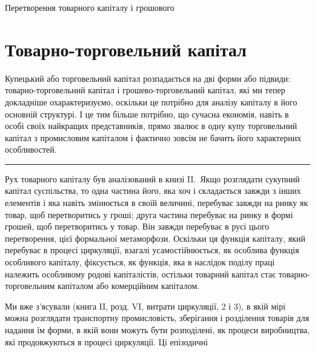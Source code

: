 

%
  {\protect\partnumberline{\thepart}Перетворення товарного капіталу і грошового}%

%
%
  {\protect{}}%

%
%
  {\protect{}}%

\section{Товарно-торговельний капітал}

Купецький або торговельний капітал розпадається на дві
форми або підвиди: товарно-торговельний капітал і грошево-торговельний
капітал, які ми тепер докладніше охарактеризуємо,
оскільки це потрібно для аналізу капіталу в його основній структурі.
І це тим більше потрібно, що сучасна економія, навіть
в особі своїх найкращих представників, прямо звалює в одну
купу торговельний капітал з промисловим капіталом і фактично
зовсім не бачить його характерних особливостей.

\pfbreak{}

Рух товарного капіталу був аналізований в книзі II.~Якщо
розглядати сукупний капітал суспільства, то одна частина
його, яка хоч і складається завжди з інших елементів і яка навіть
змінюється в своїй величині, перебуває завжди на ринку
як товар, щоб перетворитись у гроші; друга частина перебуває
на ринку в формі грошей, щоб перетворитись у товар. Він
завжди перебуває в русі цього перетворення, цієї формальної
метаморфози. Оскільки ця функція капіталу, який перебуває
в процесі циркуляції, взагалі усамостійнюється, як особлива
функція особливого капіталу, фіксується, як функція, яка в наслідок
поділу праці належить особливому родові капіталістів,
остільки товарний капітал стає товарно-торговельним капіталом
або комерційним капіталом.

Ми вже з’ясували (книга II, розд. VI, витрати циркуляції,
2 і 3), в якій мірі можна розглядати транспортну промисловість,
зберігання і розділення товарів для надання їм форми,
в якій вони можуть бути розподілені, як процеси виробництва,
які продовжуються в процесі циркуляції. Ці епізодичні
\parbreak{}  %
